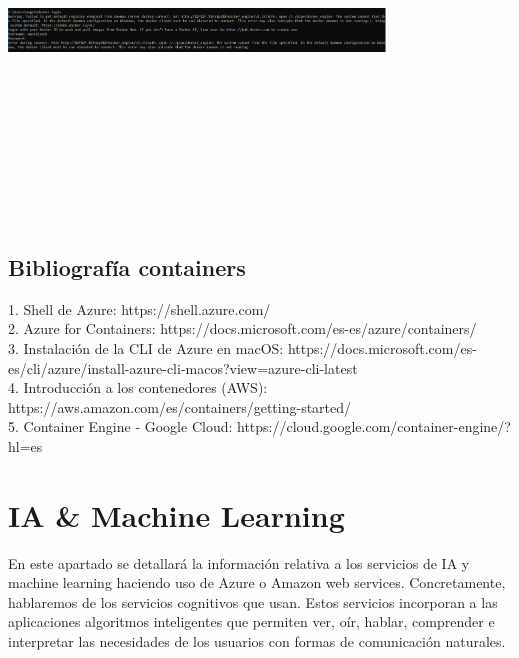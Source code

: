 \documentclass[english,runningheads,a4paper]{llncs}[2018/03/10]
\newenvironment{nscenter}
 {\parskip=0pt\par\nopagebreak\centering}
 {\par\noindent\ignorespacesafterend}
\begin{document}
\begin{nscenter}
\includegraphics[width=10cm,height=10cm,keepaspectratio]{./Contenedores/Googlecloud/50.png}
\end{nscenter}
\newpage
\subsection*{Bibliografía containers}

1. Shell de Azure: https://shell.azure.com/ \\
2. Azure for Containers: https://docs.microsoft.com/es-es/azure/containers/ \\
3. Instalación de la CLI de Azure en macOS: https://docs.microsoft.com/es-es/cli/azure/install-azure-cli-macos?view=azure-cli-latest \\
4. Introducción a los contenedores (AWS): https://aws.amazon.com/es/containers/getting-started/ \\
5. Container Engine - Google Cloud: https://cloud.google.com/container-engine/?hl=es

\newpage

\section{IA \& Machine Learning}
        En este apartado se detallará la información relativa a los servicios de
        IA y machine learning haciendo uso de Azure o Amazon web services. 
        Concretamente, hablaremos de los servicios cognitivos que usan. Estos 
        servicios incorporan a las aplicaciones algoritmos inteligentes que 
        permiten ver, oír, hablar, comprender e interpretar las necesidades de 
        los usuarios con formas de comunicación naturales.
    
\end{document}
